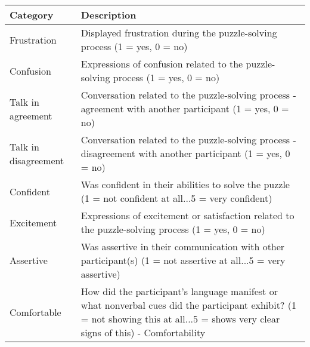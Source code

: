 \begin{table}[h]
\begin{tabular}{|l|p{8cm}|}
\hline
\textbf{Category} & \textbf{Description} \\
\hline
Frustration & Displayed frustration during the puzzle-solving process (1 = yes, 0 = no) \\
\hline
Confusion & Expressions of confusion related to the puzzle-solving process (1 = yes, 0 = no) \\
\hline
Talk in agreement & Conversation related to the puzzle-solving process - agreement with another participant (1 = yes, 0 = no) \\
\hline
Talk in disagreement & Conversation related to the puzzle-solving process - disagreement with another participant (1 = yes, 0 = no) \\
\hline
Confident & Was confident in their abilities to solve the puzzle (1 = not confident at all...5 = very confident) \\
\hline
Excitement & Expressions of excitement or satisfaction related to the puzzle-solving process (1 = yes, 0 = no) \\
\hline
Assertive & Was assertive in their communication with other participant(s) (1 = not assertive at all...5 = very assertive) \\
\hline
Comfortable & How did the participant's language manifest or what nonverbal cues did the participant exhibit? (1 = not showing this at all...5 = shows very clear signs of this) - Comfortability \\
\hline
\end{tabular}
\label{tab:categories}
\end{table}